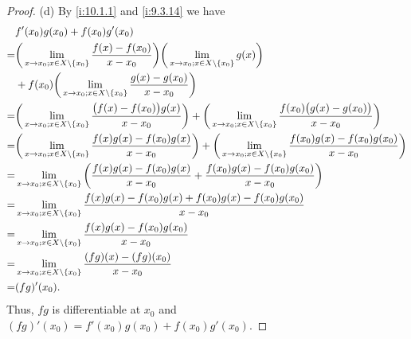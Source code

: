 \begin{proof}{(d)}
  By \cref{i:10.1.1} and \cref{i:9.3.14} we have
  \begin{align*}
      & f'(x_0) g(x_0) + f(x_0) g'(x_0)                                                                                                                                                                                       \\
    = & \bigg(\lim_{x \to x_0 ; x \in X \setminus \left\lbrace x_0\right\rbrace} \dfrac{f(x) - f(x_0)}{x - x_0}\bigg) \bigg(\lim_{x \to x_0 ; x \in X \setminus \left\lbrace x_0\right\rbrace} g(x)\bigg)                                                             \\
      & + f(x_0) \bigg(\lim_{x \to x_0 ; x \in X \setminus \left\lbrace x_0\right\rbrace} \dfrac{g(x) - g(x_0)}{x - x_0}\bigg)                                                                                                                    \\
    = & \bigg(\lim_{x \to x_0 ; x \in X \setminus \left\lbrace x_0\right\rbrace} \dfrac{\big(f(x) - f(x_0)\big) g(x)}{x - x_0}\bigg) + \bigg(\lim_{x \to x_0 ; x \in X \setminus \left\lbrace x_0\right\rbrace} \dfrac{f(x_0) \big(g(x) - g(x_0)\big)}{x - x_0}\bigg) \\
    = & \bigg(\lim_{x \to x_0 ; x \in X \setminus \left\lbrace x_0\right\rbrace} \dfrac{f(x) g(x) - f(x_0) g(x)}{x - x_0}\bigg) + \bigg(\lim_{x \to x_0 ; x \in X \setminus \left\lbrace x_0\right\rbrace} \dfrac{f(x_0) g(x) - f(x_0) g(x_0)}{x - x_0}\bigg)         \\
    = & \lim_{x \to x_0 ; x \in X \setminus \left\lbrace x_0\right\rbrace} \bigg(\dfrac{f(x) g(x) - f(x_0) g(x)}{x - x_0} + \dfrac{f(x_0) g(x) - f(x_0) g(x_0)}{x - x_0}\bigg)                                                                    \\
    = & \lim_{x \to x_0 ; x \in X \setminus \left\lbrace x_0\right\rbrace} \dfrac{f(x) g(x) - f(x_0) g(x) + f(x_0) g(x) - f(x_0) g(x_0)}{x - x_0}                                                                                                 \\
    = & \lim_{x \to x_0 ; x \in X \setminus \left\lbrace x_0\right\rbrace} \dfrac{f(x) g(x) - f(x_0) g(x_0)}{x - x_0}                                                                                                                             \\
    = & \lim_{x \to x_0 ; x \in X \setminus \left\lbrace x_0\right\rbrace} \dfrac{(fg)(x) - (fg)(x_0)}{x - x_0}                                                                                                                                   \\
    = & (fg)'(x_0).
  \end{align*}
  Thus, \(fg\) is differentiable at \(x_0\) and \((fg)'(x_0) = f'(x_0) g(x_0) + f(x_0) g'(x_0)\).
\end{proof}

